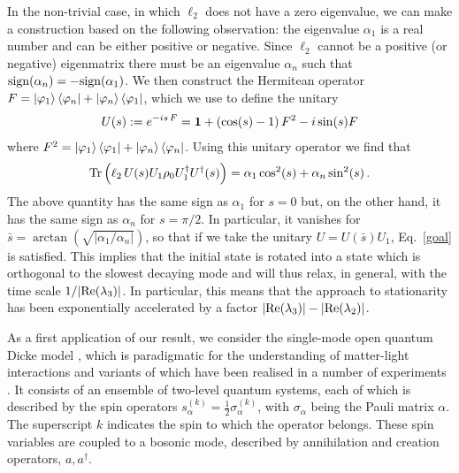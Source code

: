 \documentclass[prl,floatfix,twocolumn,superscriptaddress,showpacs,preprintnumbers,longbibliography,nofootinbib]{revtex4-1}
\begin{document}
In the non-trivial case, in which $\ell_2$ does not have a zero eigenvalue, we can make a construction based on the following observation: the eigenvalue $\alpha_1$ is a real number and can be either positive or negative. Since $\ell_2$ cannot be a positive (or negative) eigenmatrix there must be an eigenvalue $\alpha_n$ such that ${\rm sign}(\alpha_n)=-{\rm sign}(\alpha_1)$. We then construct the Hermitean operator $F=\ket{\varphi_1}\bra{\varphi_n}+\ket{\varphi_n}\bra{\varphi_1}$, 
which we use to define the unitary
\begin{equation}
\begin{split}
U(s):=e^{-is\, F}={\bf 1}+\left(\cos(s)-1\right) F^2 -i\sin(s)F
\end{split}
\end{equation}
where $F^2=\ket{\varphi_1}\bra{\varphi_1}+\ket{\varphi_n}\bra{\varphi_n}$. Using this unitary operator we find that 
\begin{equation}
\begin{split}
\Tr\left(\ell_2 \, U(s)U_1\rho_0 U_1^\dagger U^\dagger(s) \right)=\alpha_1\cos^2(s)+\alpha_n\sin^2(s)\, .
\end{split}
\label{fin-part}
\end{equation}
The above quantity has the same sign as $\alpha_1$ for $s=0$ but, on the other hand, it has the same sign as $\alpha_n$ for $s=\pi/2$. In particular, it vanishes for $\bar{s}=\arctan \left(\sqrt{\left|\alpha_1/\alpha_n\right|}\right)$, so that if we take the unitary $U=U(\bar{s})U_1$, Eq.~\eqref{goal} is satisfied. This implies that the initial state is rotated into a state which is orthogonal to the slowest decaying mode and will thus relax, in general, with the time scale $1/|{\rm Re}(\lambda_3)|$. In particular, this means that the approach to stationarity has been exponentially accelerated by a factor $|{\rm Re}(\lambda_3)|-|{\rm Re}(\lambda_2)|$.


 As a first application of our result, we consider the single-mode open quantum Dicke model \cite{kirton2019,roses2020}, which is paradigmatic for the understanding of matter-light interactions and variants of which have been realised in a number of experiments \cite{dimer2007,nagy2010,baumann2010,ritsch2013,klinder2015}. It consists of an ensemble of two-level quantum systems, each of which is described by the spin operators $s_\alpha^{(k)}=\frac{1}{2}\sigma_{\alpha}^{(k)}$, with  $\sigma_\alpha$ being the Pauli matrix $\alpha$. The superscript $k$ indicates the spin to which the operator belongs. These spin variables are coupled to a bosonic mode, described by annihilation and creation operators, $a,a^\dagger$. 
\end{document}
